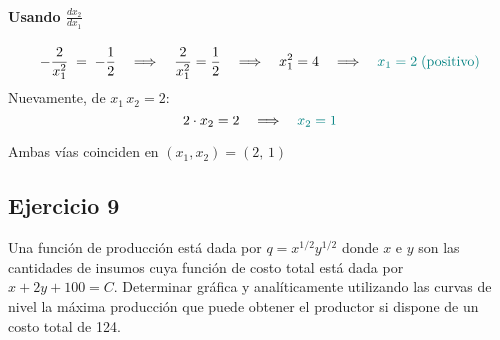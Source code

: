 \documentclass{article}
\begin{document}
\paragraph{Usando \(\tfrac{dx_2}{dx_1}\)}

\[
-\frac{2}{x_1^2} \;=\; -\frac{1}{2}
\quad \Longrightarrow \quad
\frac{2}{x_1^2} = \frac{1}{2}
\quad \Longrightarrow \quad
x_1^2 = 4
\quad \Longrightarrow \quad
\color{teal}{x_1 = 2} \; (\text{positivo})
\]
Nuevamente, de \(x_1\,x_2 = 2\):
\[
2 \cdot x_2 = 2
\quad \Longrightarrow \quad
\color{teal}{x_2 = 1}
\]

{\color{teal}Ambas vías coinciden en \((x_1, x_2) = (2,\,1)\)}

\newpage
\subsection{Ejercicio 9}
Una función de producción está dada por $q=x^{1/2}y^{1/2}$ donde $x$ e $y$ son las cantidades de insumos cuya función de costo total está dada por $x+2y+100=C$. Determinar gráfica y analíticamente utilizando las curvas de nivel la máxima producción que puede obtener el productor si dispone de un costo total de 124.

\newpage
\end{document}
